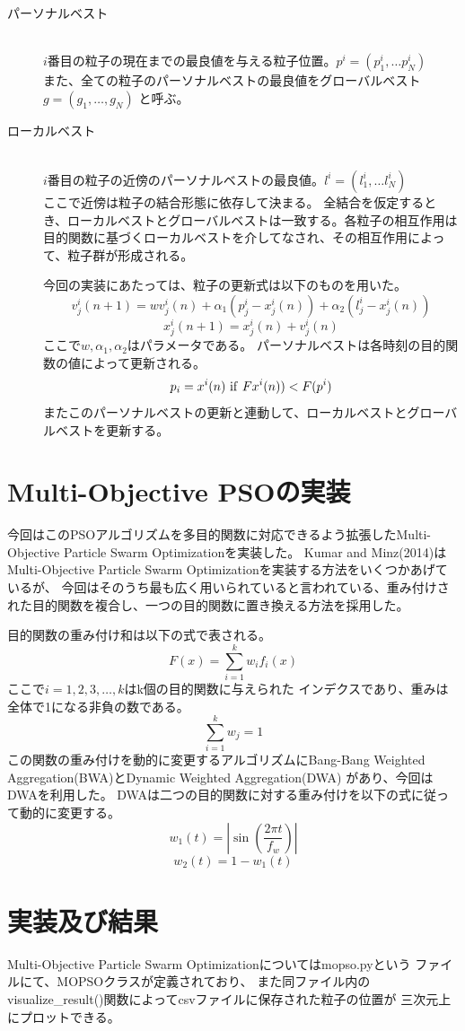 \documentclass[uplatex]{jsarticle}
\begin{document}
\begin{description}
  \item[パーソナルベスト]\mbox{}\\
  $i$番目の粒子の現在までの最良値を与える粒子位置。$p^i = (p_1^i, \dots p_N^i)$ \\
  また、全ての粒子のパーソナルベストの最良値をグローバルベスト$g = (g_1, \ldots, g_N)$
  と呼ぶ。
  \item[ローカルベスト]\mbox{}\\
  $i$番目の粒子の近傍のパーソナルベストの最良値。$l^i = (l_1^i, \dots l_N^i)$\\
  ここで近傍は粒子の結合形態に依存して決まる。
  全結合を仮定するとき、ローカルベストとグローバルベストは一致する。各粒子の相互作用は
  目的関数に基づくローカルベストを介してなされ、その相互作用によって、粒子群が形成される。

  今回の実装にあたっては、粒子の更新式は以下のものを用いた。
  $$v_j^i(n+1) = wv_j^i(n) + \alpha_1(p_j^i - x_j^i(n)) + \alpha_2(l_j^i - x_j^i(n))$$
  $$x_j^i(n+1) = x_j^i(n) + v_j^i(n)$$
  ここで$w, \alpha_1, \alpha_2$はパラメータである。
  パーソナルベストは各時刻の目的関数の値によって更新される。
  $$p_i = x^i(n)\ {\rm if}\ Fx^i(n)) < F(p^i)$$
  またこのパーソナルベストの更新と連動して、ローカルベストとグローバルベストを更新する。
\end{description}

\section{Multi-Objective PSOの実装}
今回はこのPSOアルゴリズムを多目的関数に対応できるよう拡張したMulti-Objective Particle Swarm Optimizationを実装した。
Kumar and Minz(2014)はMulti-Objective Particle Swarm Optimizationを実装する方法をいくつかあげているが、
今回はそのうち最も広く用いられていると言われている、重み付けされた目的関数を複合し、一つの目的関数に置き換える方法を採用した。

目的関数の重み付け和は以下の式で表される。
$$F(x) = \sum_{i=1}^k w_i f_i(x)$$
ここで$i=1,2,3, \ldots, k$はk個の目的関数に与えられた
インデクスであり、重みは全体で1になる非負の数である。
$$\sum_{i=1}^k w_j = 1$$
この関数の重み付けを動的に変更するアルゴリズムにBang-Bang
Weighted Aggregation(BWA)とDynamic Weighted Aggregation(DWA)
があり、今回はDWAを利用した。
DWAは二つの目的関数に対する重み付けを以下の式に従って動的に変更する。
$$w_1(t) = \left|\sin{\left(\frac{2\pi t}{f_w}\right)}\right|$$
$$w_2(t) = 1 - w_1(t)$$

\section{実装及び結果}
Multi-Objective Particle Swarm Optimizationについてはmopso.pyという
ファイルにて、MOPSOクラスが定義されており、
また同ファイル内のvisualize\_result()関数によってcsvファイルに保存された粒子の位置が
三次元上にプロットできる。
\end{document}
